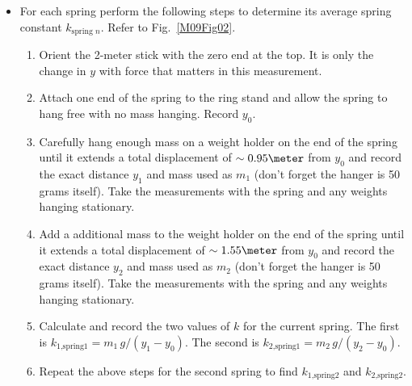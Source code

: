 \begin{itemize}
\item For each spring perform the following steps to determine its average spring constant $k_{\text{spring }n}$.  Refer to Fig.~\ref{M09Fig02}.
  \begin{enumerate}
  \item Orient the 2-meter stick with the zero end at the top. It is only the change in $y$ with force that matters in this measurement. 
  \item Attach one end of the spring to the ring stand and allow the spring to hang free with no mass hanging. Record $y_0$.
  \item Carefully hang enough mass on a weight holder on the end of the spring until it extends a total displacement of $\sim 0.95 \meter$ from $y_0$ and record the exact distance $y_1$ and mass used as $m_1$ (don't forget the hanger is 50 grams itself). Take the measurements with the spring and any weights hanging stationary.
  \item Add a additional mass to the weight holder on the end of the spring until it extends a total displacement of $\sim 1.55 \meter$ from $y_0$ and record the exact distance $y_2$ and mass used as $m_2$ (don't forget the hanger is 50 grams itself). Take the measurements with the spring and any weights hanging stationary.
    \item Calculate and record the two values of $k$ for the current spring.  The first is $k_{1\text{,spring1}}=m_1 \,g/(y_1 - y_0)$.  The second is $k_{2\text{,spring1}}=m_2 \,g/(y_2 - y_0)$.
    \item Repeat the above steps for the second spring to find $k_{1\text{,spring2}}$ and $k_{2\text{,spring2}}$.

\end{enumerate}
\end{itemize}
